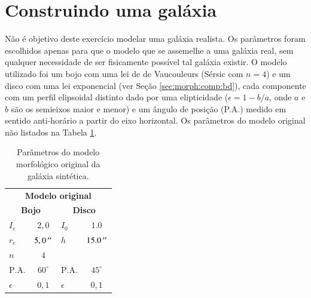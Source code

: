 \section{Construindo uma galáxia}

Não é objetivo deste exercício modelar uma galáxia realista. Os parâmetros foram
escolhidos apenas para que o modelo que se assemelhe a uma galáxia real, sem
qualquer necessidade de ser fisicamente possível tal galáxia existir. O modelo
utilizado foi um bojo com uma lei de de Vaucouleurs (Sérsic com $n=4$) e um
disco com uma lei exponencial (ver Seção \ref{sec:morph:comp:bd}), cada
componente com um perfil elipsoidal distinto dado por uma elipticidade
($\epsilon = 1 - b/a$, onde $a$ e $b$ são os semieixos maior e menor) e um
ângulo de posição (P.A.) medido em sentido anti-horário a partir do eixo
horizontal. Os parâmetros do modelo original não listados na Tabela
\ref{tab:testeModeloOriginal}.

\begin{table}
\begin{tabular}{ l  c | l  c }
  \hline
  \multicolumn{4}{c}{\textbf{Modelo original}} \\
  \multicolumn{2}{c}{\textbf{Bojo}} & \multicolumn{2}{c}{\textbf{Disco}} \\
  \hline
  $I_e$ & $2,0$ & $I_0$ & $1.0$ \\
  $r_e$ & $5,0\,^{\prime\prime}$ & $h$ & $15.0\,^{\prime\prime}$ \\
  $n$ & $4$ & & \\
  $\mathrm{P.A.}$ & $60^\circ$ & $\mathrm{P.A.}$ & $45^\circ$ \\
  $\epsilon$ & $0,1$ & $\epsilon$ & $0,1$ \\
  \hline
\end{tabular}
\caption[Modelo morfológico original da galáxia sintética]
{Parâmetros do modelo morfológico original da galáxia sintética.}
\label{tab:testeModeloOriginal}
\end{table}

